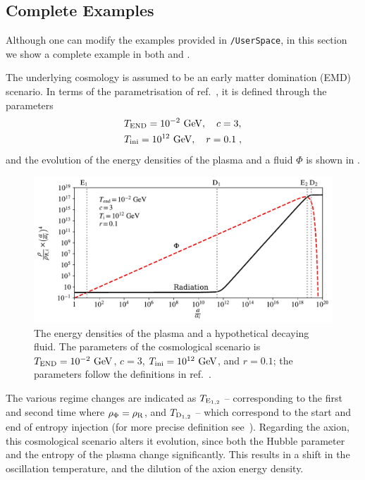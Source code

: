 \documentclass[11pt,a4paper]{article}
\begin{document}
\subsection{Complete Examples}\label{sec:complete_examples}
%
Although one can modify the examples provided in {\tt \mimes/UserSpace}, in this section we show a complete example in both \CPP and \PY. 
%

The underlying cosmology is assumed to be an early matter domination (EMD) scenario. In terms of the parametrisation of ref.~\cite{Arias:2020qty}, it is defined through the parameters
%
\begin{eqnarray}
	&T_{\rm END}=10^{-2}~{\rm GeV},\quad c=3, \nonumber \\
	&T_{\rm ini}=10^{12}~{\rm GeV}, \quad r=0.1 \;,
	\label{eq:cosmology_example}
\end{eqnarray}
%
and the evolution of the energy densities of the plasma and a fluid $\Phi$ is shown in .
%
\begin{figure}[t]
	\includegraphics[width=1\textwidth]{figs/energy_densities.pdf}
	\caption{The energy densities of the plasma and a hypothetical decaying fluid. The parameters of the cosmological scenario is $T_{\rm END}=10^{-2}~{\rm GeV}$, $c=3$, $T_{\rm ini}=10^{12}~{\rm GeV}$, and $r=0.1$; the parameters  follow the definitions in ref.~\cite{Arias:2020qty}. }
	\label{fig:energy_densities}
\end{figure}
%
The various regime changes are indicated as $T_{{\rm E}_{1,2}}$ -- corresponding to the first and second time where $\rho_{\Phi} = \rho_{\rm R}$,  and $T_{{\rm D}_{1,2}}$ -- which correspond to the start and end of entropy injection (for more precise definition see~\cite{Arias:2020qty}). Regarding the axion, this cosmological scenario alters it evolution, since both the Hubble parameter and the entropy of the plasma change significantly. This results in a shift in the oscillation temperature, and the dilution of the axion energy density.
\end{document}
